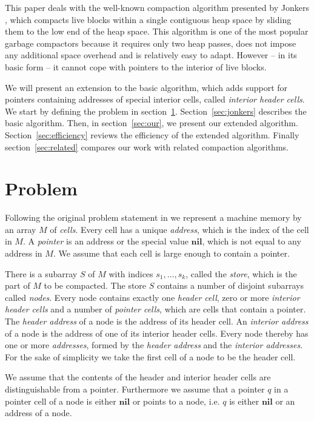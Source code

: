 \documentclass[10pt,a4paper,final,twocolumn]{article}
\begin{document}
This paper deals with the well-known compaction algorithm presented by Jonkers \cite{Jonkers79},
which compacts live blocks within a single contiguous heap space by sliding them to the low end
of the heap space. This algorithm is one of the most popular garbage compactors because it requires
only two heap passes, does not impose any additional space overhead and is relatively easy to
adapt. However -- in its basic form -- it cannot cope with pointers to the interior of live blocks.

We will present an extension to the basic algorithm, which adds support for pointers containing
addresses of special interior cells, called \emph{interior header cells}. We start by defining the
problem in section~\ref{sec:problem}. Section~\ref{sec:jonkers} describes the basic algorithm.
Then, in section~\ref{sec:our}, we present our extended algorithm. Section~\ref{sec:efficiency}
reviews the efficiency of the extended algorithm. Finally section~\ref{sec:related} compares our
work with related compaction algorithms.


\section{Problem}
\label{sec:problem}


Following the original problem statement in \cite{Jonkers79} we represent a machine memory
by an array $M$ of \emph{cells}. Every cell has a unique \emph{address}, which is the index
of the cell in $M$. A \emph{pointer} is an address or the special value $\mathbf{nil}$, which
is not equal to any address in $M$. We assume that each cell is large enough to contain a
pointer.

There is a subarray $S$ of $M$ with indices $s_1,\ldots,s_k$, called the \emph{store}, which is
the part of $M$ to be compacted.
The store $S$ contains a number of disjoint subarrays called \emph{nodes}. Every node contains
exactly one \emph{header cell}, zero or more \emph{interior header cells} and a number of
\emph{pointer cells}, which are cells that contain a pointer. The \emph{header address} of a
node is the address of its header cell. An \emph{interior address} of a node is the address
of one of its interior header cells. Every node thereby has one or more \emph{addresses},
formed by the \emph{header address} and the \emph{interior addresses}.
For the sake of simplicity we take the first cell of a node to be the
header cell.

We assume that the contents of the header and interior header cells are distinguishable from
a pointer. Furthermore we assume that a pointer $q$ in a pointer cell of a node is
either $\mathbf{nil}$ or points to a node, i.e. $q$ is either $\mathbf{nil}$ or an
address of a node.
\end{document}
